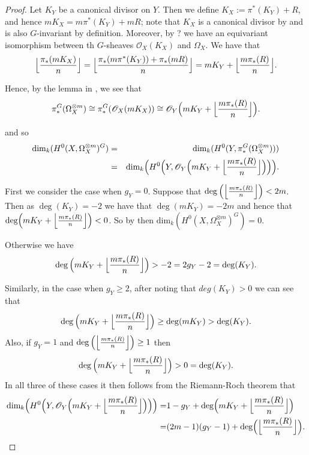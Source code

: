 \documentclass[11pt]{article} %
\begin{document}
\begin{proof}

Let $K_Y$ be a canonical divisor on $Y$. Then we define $K_X:=\pi^*(K_Y)+R$, and hence $mK_X=m\pi^*(K_Y)+mR$; note that $K_X$ is a canonical divisor by \citep[Chap. IV,\ prop 2.3]{hart} and is also $G$-invariant by definition. Moreover, by ? we have an equivariant isomorphism between th $G$-sheaves $\mathscr{O}_X(K_X)$ and $\Omega_X$. We have that
	\[ 
		\Big{\lfloor}{\frac{\pi_*(mK_X)}{n}} \Big{\rfloor}
		= \Big{\lfloor}{\frac{\pi_*(m\pi^*(K_Y))+\pi_*(mR)}{n}} \Big{\rfloor}
		= mK_Y+\Big{\lfloor} {\frac{m\pi_*(R)}{n}}\Big{\rfloor}.
	\]
	
Hence, by the lemma in \citep{faithfulaction}, we see that 
	\[
		\pi_*^G(\Omega_X^{\otimes m})\cong \pi_*^G(\mathscr{O}_X(mK_X))\cong \mathscr{O}_Y\Big(mK_Y 			+\Big{\lfloor}{\frac{m\pi_*(R)}{n}}\Big{\rfloor}\Big).
	\]

and so
	\begin{eqnarray*}
		\mbox{dim}_k(H^0(X,\Omega_{X}^{\otimes m})^G)&=&
		\mbox{dim}_k(H^0(Y,\pi_*^G(\Omega_{X}^{\otimes m})))\\
		&=&\mbox{dim}_k\Big(H^0\Big(Y,\mathscr{O}_Y\Big(mK_Y+\Big{\lfloor}{\frac{m\pi_*(R)}						{n}}\Big{\rfloor}\Big)\Big)\Big).
	\end{eqnarray*}

First we consider the case when $g_Y=0$. Suppose that $\deg\Big(\Big{\lfloor}{\frac{m\pi_* (R)}{n}}\Big{\rfloor}\Big) < 2m$. Then as $\deg(K_Y)=-2$ we have that $\deg(mK_Y)=-2m$ and hence that $\mbox{deg}\Big(mK_Y +\Big{\lfloor}{\frac{m\pi_*(R)}{n}}\Big{\rfloor}\Big)<0$. So by \citep[prop. 3, {\S}8]{fulton} then $\mbox{dim}_k(H^0(X,\Omega_{X}^{\otimes m})^G)=0.$


Otherwise we have 
	\[
		\deg\Big(mK_Y+\Big{\lfloor}\frac{m\pi_*(R)}{n}\Big{\rfloor}\Big)>-2=2g_Y-2=\deg(K_Y).
	\]

Similarly, in the case when $g_Y\geq2$, after noting that $deg(K_Y)>0$ we can see that
	\[
		\deg\Big(mK_Y+\Big{\lfloor}\frac{m\pi_*(R)}{n}\Big{\rfloor}\Big)\geq\deg(mK_Y)>\deg(K_Y).
	\]
Also, if $g_Y=1$ and $\deg\Big(\Big{\lfloor}\frac{m\pi_*(R)}{n}\Big{\rfloor}\Big)\geq1$ then
	\[
		\deg\Big(mK_Y+\Big
{\lfloor}\frac{m\pi_*(R)}{n}\Big{\rfloor}\Big)>0=\deg(K_Y).
	\]
In all three of these cases it then follows from the Riemann-Roch theorem \citep[Cor. 2, {\S}8]{fulton} that 
	\begin{eqnarray*}
			\mbox{dim}_k\Big(H^0\Big(Y,\mathscr{O}_Y\Big(mK_Y+\Big{\lfloor}{\frac{m\pi_*(R)}						{n}}\Big{\rfloor} \Big)\Big)\Big)= & 1-g_Y+\mbox{deg}\Big(mK_Y+\Big{\lfloor}{\frac{m\pi_*(R)}					{n}}\Big{\rfloor}\Big) \\
			= & (2m-1)(g_Y-1)+\mbox{deg}\Big(\Big{\lfloor}{\frac{m\pi_*(R)}{n}}\Big{\rfloor}\Big).
	\end{eqnarray*}


\end{proof}
\end{document}
